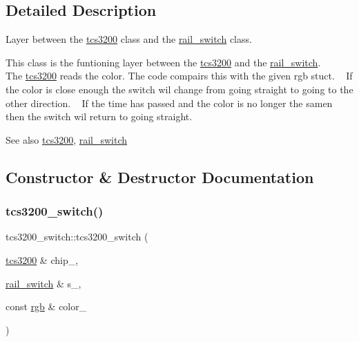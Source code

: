 \subsection{Detailed Description}
Layer between the \hyperlink{classtcs3200}{tcs3200} class and the \hyperlink{classrail__switch}{rail\+\_\+switch} class. 

This class is the funtioning layer between the \hyperlink{classtcs3200}{tcs3200} and the \hyperlink{classrail__switch}{rail\+\_\+switch}. ~\newline
 ~\newline
 The \hyperlink{classtcs3200}{tcs3200} reads the color. The code compairs this with the given rgb stuct. ~\newline
 If the color is close enough the switch wil change from going straight to going to the other direction. ~\newline
 If the time has passed and the color is no longer the samen then the switch wil return to going straight. \begin{DoxySeeAlso}{See also}
\hyperlink{classtcs3200}{tcs3200}, \hyperlink{classrail__switch}{rail\+\_\+switch} 
\end{DoxySeeAlso}


\subsection{Constructor \& Destructor Documentation}
\mbox{\label{classtcs3200__switch_a30625561212b744877df9c266c82dbc8}} 
\subsubsection{\texorpdfstring{tcs3200\+\_\+switch()}{tcs3200\_switch()}}
{\footnotesize\ttfamily tcs3200\+\_\+switch\+::tcs3200\+\_\+switch (\begin{DoxyParamCaption}\item[{\hyperlink{classtcs3200}{tcs3200} \&}]{chip\+\_\+,  }\item[{\hyperlink{classrail__switch}{rail\+\_\+switch} \&}]{s\+\_\+,  }\item[{const \hyperlink{structrgb}{rgb} \&}]{color\+\_\+ }\end{DoxyParamCaption})\hspace{0.3cm}{\ttfamily [inline]}}



